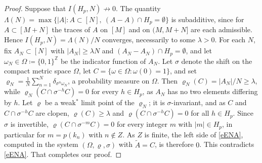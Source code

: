 \begin{proof}
Suppose that $I(H_p,N)\not\to 0$. 
The quantity $\Lambda (N)=\max \{\lvert A\rvert \colon A\subset [N], \ (A-A)\cap H_p=\emptyset \}$ is subadditive, since for $A\subset [M+N]$ the traces of $A$ on $[M]$ and on $(M,M+N]$ are each admissible. 
Hence $I(H_p,N)=\Lambda (N)/N$ converges, necessarily to some $\lambda >0$. 
For each $N$, fix $A_N\subset [N]$ with $\lvert A_N\rvert \geq \lambda N$ and $(A_N-A_N)\cap H_p=\emptyset$, and let $\omega_N\in \Omega \coloneqq \{0,1\}^{\mathbb{Z}}$ be the indicator function of $A_N$. 
Let $\sigma $ denote the shift on the compact metric space $\Omega $, let $C=\{\omega \in \Omega \colon \omega (0)=1\}$, and set $\varrho_N=\frac 1N\sum_{n=1}^{N}\delta_{\sigma ^n\omega_N}$, a probability measure on $\Omega $. 
Then $\varrho_N(C)=\lvert A_N\rvert /N\geq \lambda $, while $\varrho_N(C\cap \sigma ^{-h}C)=0$ for every $h\in H_p$, as $A_N$ has no two elements differing by $h$. 
Let $\varrho $ be a weak$^\ast$ limit point of the $\varrho_N$; it is $\sigma $-invariant, and as $C$ and $C\cap \sigma ^{-h}C$ are clopen, 
$\varrho (C)\geq \lambda $ and $\varrho (C\cap \sigma ^{-h}C)=0$ for all $h\in H_p$. 
Since $\sigma $ is invertible, $\varrho (C\cap \sigma ^{-m}C)=0$ for every integer $m$ with $\lvert m\rvert \in H_p$, in particular for $m=p(k_n)$ with $n\notin Z$. 
As $Z$ is finite, the left side of \eqref{eENA}, computed in the system $(\Omega ,\varrho ,\sigma )$ with $\tilde A=C$, is therefore $0$. This contradicts \eqref{eENA}. 
That completes our proof. 
\end{proof}




